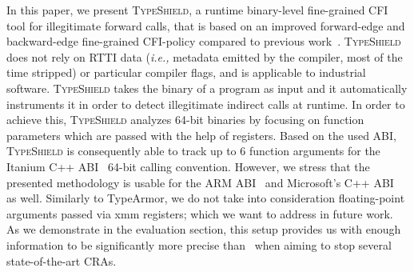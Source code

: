 In this paper, we present \textsc{TypeShield}, a runtime binary-level fine-grained CFI tool for illegitimate forward calls, 
that is based on an improved forward-edge and backward-edge fine-grained CFI-policy 
compared to previous work~\cite{veen:typearmor}. 
\textsc{TypeShield} does not rely on RTTI data (\textit{i.e.,} metadata emitted by the compiler, most of the time stripped) or 
particular compiler flags, and is applicable to industrial software.
\textsc{TypeShield} takes the binary of a program as input and it automatically instruments it in order
to detect illegitimate indirect calls at runtime. In order to achieve this, 
\textsc{TypeShield} analyzes 64-bit binaries by focusing on function parameters which are passed with the 
help of registers. Based on the used ABI, \textsc{TypeShield} is consequently able to track up to 6 function arguments for the 
Itanium C++ ABI~\cite{itanium:abi} 64-bit calling convention.
However, we stress that the presented methodology is usable for the ARM ABI~\cite{arm:abi} and Microsoft's C++ ABI~\cite{microsoft:abi} as well.
Similarly to TypeArmor, we do not take into consideration floating-point arguments passed via xmm registers; which we want to address in future work. 
As we demonstrate in the evaluation section, this setup provides us with enough information to be significantly more precise than~\cite{veen:typearmor} 
when aiming to stop several state-of-the-art CRAs.

